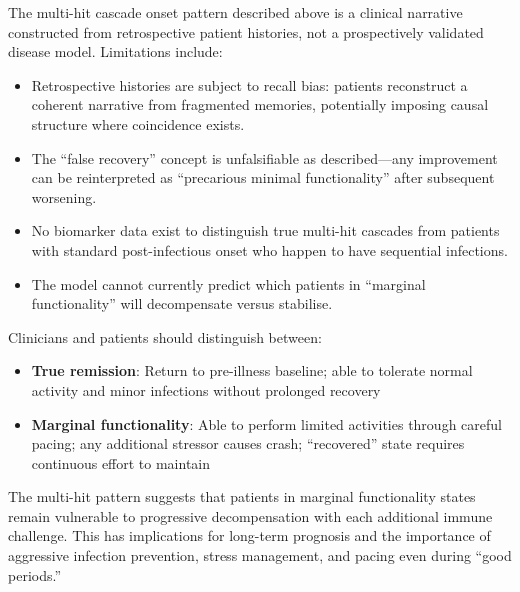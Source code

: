 \begin{limitation}
The multi-hit cascade onset pattern described above is a clinical narrative constructed from retrospective patient histories, not a prospectively validated disease model. Limitations include:
\begin{itemize}
    \item Retrospective histories are subject to recall bias: patients reconstruct a coherent narrative from fragmented memories, potentially imposing causal structure where coincidence exists.
    \item The ``false recovery'' concept is unfalsifiable as described---any improvement can be reinterpreted as ``precarious minimal functionality'' after subsequent worsening.
    \item No biomarker data exist to distinguish true multi-hit cascades from patients with standard post-infectious onset who happen to have sequential infections.
    \item The model cannot currently predict which patients in ``marginal functionality'' will decompensate versus stabilise.
\end{itemize}
\end{limitation}

\begin{warning}
\label{warn:false-recovery}
Clinicians and patients should distinguish between:
\begin{itemize}
    \item \textbf{True remission}: Return to pre-illness baseline; able to tolerate normal activity and minor infections without prolonged recovery
    \item \textbf{Marginal functionality}: Able to perform limited activities through careful pacing; any additional stressor causes crash; ``recovered'' state requires continuous effort to maintain
\end{itemize}
The multi-hit pattern suggests that patients in marginal functionality states remain vulnerable to progressive decompensation with each additional immune challenge. This has implications for long-term prognosis and the importance of aggressive infection prevention, stress management, and pacing even during ``good periods.''
\end{warning}

